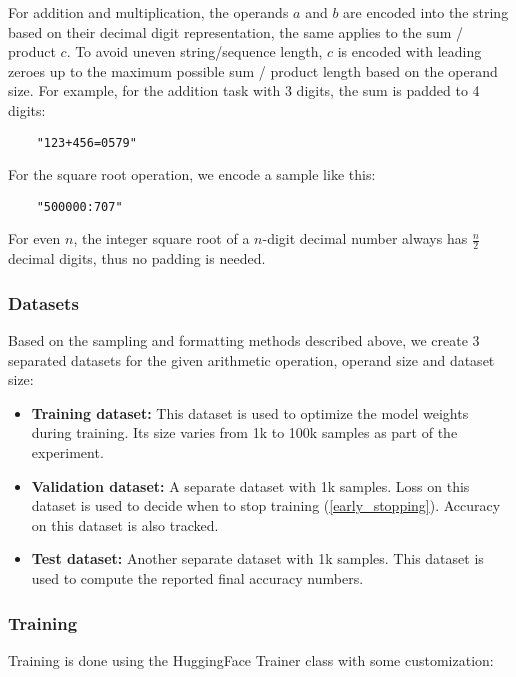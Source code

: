 For addition and multiplication, the operands $a$ and $b$ are encoded into the string based on their decimal digit representation, the same applies to the sum / product $c$. 
To avoid uneven string/sequence length, $c$ is encoded with leading zeroes up to the maximum possible sum / product length based on the operand size. For example, for the addition task with 3 digits, the sum is padded to 4 digits:

\begin{lstlisting}
	"123+456=0579"
\end{lstlisting}

For the square root operation, we encode a sample like this:

\begin{lstlisting}
	"500000:707"
\end{lstlisting}

For even $n$, the integer square root of a $n$-digit decimal number always has $\frac{n}{2}$ decimal digits, thus no padding is needed.

\subsubsection{Datasets}

Based on the sampling and formatting methods described above, we create 3 separated datasets for the given arithmetic operation, operand size and dataset size:

\begin{itemize}
	\item \textbf{Training dataset:} This dataset is used to optimize the model weights during training. Its size varies from 1k to 100k samples as part of the experiment.
	\item \textbf{Validation dataset:} A separate dataset with 1k samples. Loss on this dataset is used to decide when to stop training (\cref{early_stopping}). Accuracy on this dataset is also tracked.
	\item \textbf{Test dataset:} Another separate dataset with 1k samples. This dataset is used to compute the reported final accuracy numbers.
\end{itemize} 

\subsubsection{Training}

Training is done using the HuggingFace Trainer class with some customization:

